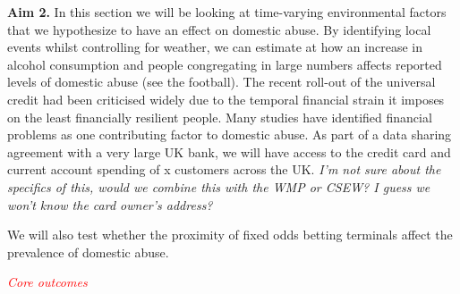 \documentclass[11pt, a4paper]{article}
\begin{document}
\textbf{Aim 2.} In this section we will be looking at time-varying environmental factors that we hypothesize to have an effect on domestic abuse. By identifying local events whilst controlling for weather, we can estimate at how an increase in alcohol consumption and people congregating in large numbers affects reported levels of domestic abuse (see the football).  The recent roll-out of the universal credit had been criticised widely due to the temporal financial strain it imposes on the least financially resilient people. Many studies have identified financial problems as one contributing factor to domestic abuse. As part of a data sharing agreement with a very large UK bank, we will have access to the credit card and current account spending of x customers across the UK. \textit{I'm not sure about the specifics of this, would we combine this with the WMP or CSEW? I guess we won't know the card owner's address?}

We will also test whether the proximity of fixed odds betting terminals affect the prevalence of domestic abuse.

\textcolor{red}{\textit{Core outcomes}}
%
%
%
%
%
%
%
%
%


%
%

%
%
%
%
%
%
%
%

\newpage



\end{document}
